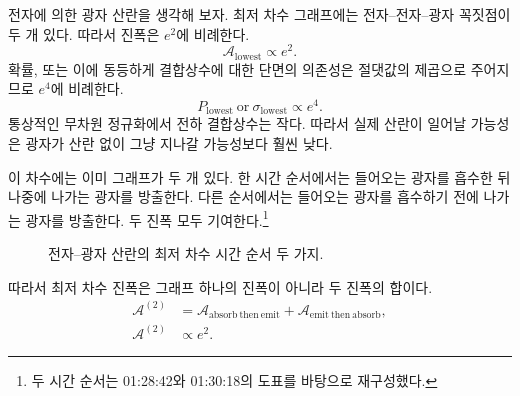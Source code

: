\begin{classroomqa}
\end{classroomqa}

전자에 의한 광자 산란을 생각해 보자. 최저 차수 그래프에는 전자--전자--광자 꼭짓점이 두 개 있다. 따라서 진폭은 \(e^2\)에 비례한다.
\begin{equation}
\mathcal{A}_{\mathrm{lowest}}\propto e^2.
\end{equation}
확률, 또는 이에 동등하게 결합상수에 대한 단면의 의존성은 절댓값의 제곱으로 주어지므로 \(e^4\)에 비례한다.
\begin{equation}
P_{\mathrm{lowest}}\ \text{or}\ \sigma_{\mathrm{lowest}}
\propto e^4.
\end{equation}
통상적인 무차원 정규화에서 전하 결합상수는 작다. 따라서 실제 산란이 일어날 가능성은 광자가 산란 없이 그냥 지나갈 가능성보다 훨씬 낮다.

이 차수에는 이미 그래프가 두 개 있다. 한 시간 순서에서는 들어오는 광자를 흡수한 뒤 나중에 나가는 광자를 방출한다. 다른 순서에서는 들어오는 광자를 흡수하기 전에 나가는 광자를 방출한다. 두 진폭 모두 기여한다.\footnote{두 시간 순서는 01:28:42와 01:30:18의 도표를 바탕으로 재구성했다.}

\begin{figure}[htbp]
\centering
{}
\caption{전자--광자 산란의 최저 차수 시간 순서 두 가지.}
\end{figure}

따라서 최저 차수 진폭은 그래프 하나의 진폭이 아니라 두 진폭의 합이다.
\begin{equation}
\begin{aligned}
\mathcal{A}^{(2)}
&=
\mathcal{A}_{\mathrm{absorb\ then\ emit}}
+\mathcal{A}_{\mathrm{emit\ then\ absorb}},\\
\mathcal{A}^{(2)}&\propto e^2.
\end{aligned}
\end{equation}

